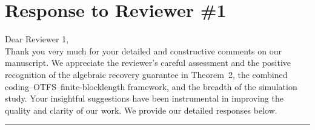 \section{Response to Reviewer \#1}

Dear Reviewer 1,\\

Thank you very much for your detailed and constructive comments on our manuscript. We appreciate the reviewer's careful assessment and the positive recognition of the algebraic recovery guarantee in Theorem~2, the combined coding--OTFS--finite-blocklength framework, and the breadth of the simulation study. Your insightful suggestions have been instrumental in improving the quality and clarity of our work. We provide our detailed responses below.

\noindent\rule{17cm}{2.0pt}

